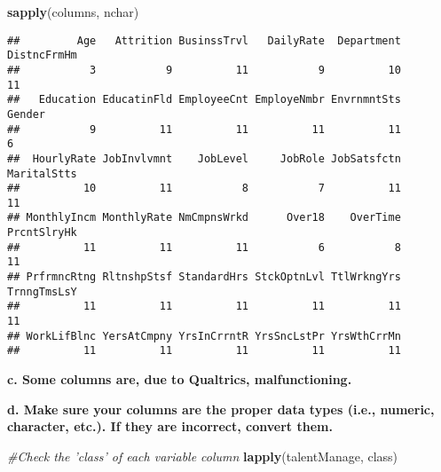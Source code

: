 \documentclass[]{article}
\newenvironment{Shaded}{\begin{snugshade}}{\end{snugshade}}
\newcommand{\KeywordTok}[1]{\textcolor[rgb]{0.13,0.29,0.53}{\textbf{{#1}}}}
\newcommand{\CommentTok}[1]{\textcolor[rgb]{0.56,0.35,0.01}{\textit{{#1}}}}
\newcommand{\NormalTok}[1]{{#1}}
\begin{document}
\begin{Shaded}
\begin{Highlighting}[]
\KeywordTok{sapply}\NormalTok{(columns, nchar)}
\end{Highlighting}
\end{Shaded}

\begin{verbatim}
##         Age   Attrition BusinssTrvl   DailyRate  Department DistncFrmHm 
##           3           9          11           9          10          11 
##   Education EducatinFld EmployeeCnt EmployeNmbr EnvrnmntSts      Gender 
##           9          11          11          11          11           6 
##  HourlyRate JobInvlvmnt    JobLevel     JobRole JobSatsfctn MaritalStts 
##          10          11           8           7          11          11 
## MonthlyIncm MonthlyRate NmCmpnsWrkd      Over18    OverTime PrcntSlryHk 
##          11          11          11           6           8          11 
## PrfrmncRtng RltnshpStsf StandardHrs StckOptnLvl TtlWrkngYrs TrnngTmsLsY 
##          11          11          11          11          11          11 
## WorkLifBlnc YersAtCmpny YrsInCrrntR YrsSncLstPr YrsWthCrrMn 
##          11          11          11          11          11
\end{verbatim}

\textbf{c. Some columns are, due to Qualtrics, malfunctioning. }

\textbf{d. Make sure your columns are the proper data types (i.e.,
numeric, character, etc.). If they are incorrect, convert them.}

\begin{Shaded}
\begin{Highlighting}[]
\CommentTok{#Check the 'class' of each variable column}
\KeywordTok{lapply}\NormalTok{(talentManage, class)}
\end{Highlighting}
\end{Shaded}
\end{document}
